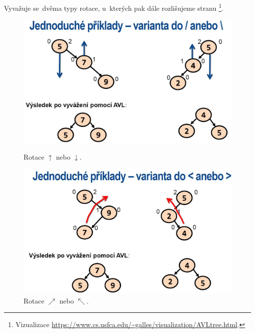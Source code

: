Vyvažuje se~dvěma typy rotace, u~kterých pak dále rozlišujeme stranu%
\footnote{Vizualizace \url{https://www.cs.usfca.edu/~galles/visualization/AVLtree.html}.}.

\begin{figure}[ht]
	\begin{minipage}[b]{0.47\textwidth}
		\includegraphics[width=\textwidth]{images/Rotation1Type.JPG}
		\caption{Rotace \( \uparrow \) nebo \( \downarrow \).}
	\end{minipage}
	\hspace*{1em}%
	\begin{minipage}[b]{0.47\textwidth}
		\includegraphics[width=\textwidth]{images/Rotation2Type.JPG}
		\caption{Rotace \( \nearrow \) nebo \( \nwarrow \).}
	\end{minipage}
\end{figure}

